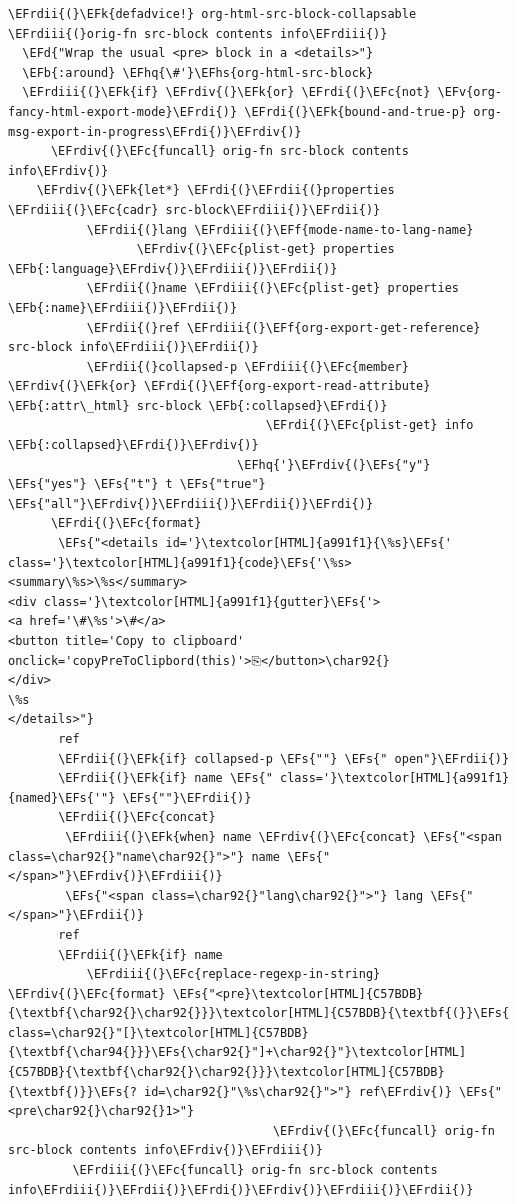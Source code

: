 \documentclass{scrartcl}
\newcommand{\EFk}[1]{\textcolor{EFk}{#1}} %
\newcommand{\EFd}[1]{\textcolor{EFd}{#1}} %
\newcommand{\EFs}[1]{\textcolor{EFs}{#1}} %
\newcommand{\EFb}[1]{\textcolor{EFb}{#1}} %
\newcommand{\EFc}[1]{\textcolor{EFc}{#1}} %
\newcommand{\EFv}[1]{\textcolor{EFv}{#1}} %
\newcommand{\EFf}[1]{\textcolor{EFf}{#1}} %
\newcommand{\EFhq}[1]{#1} %
\newcommand{\EFhs}[1]{#1} %
\newcommand{\EFrdi}[1]{#1} %
\newcommand{\EFrdii}[1]{#1} %
\newcommand{\EFrdiii}[1]{#1} %
\newcommand{\EFrdiv}[1]{#1} %
\begin{document}
\begin{Code}
\begin{Verbatim}[]
\EFrdii{(}\EFk{defadvice!} org-html-src-block-collapsable \EFrdiii{(}orig-fn src-block contents info\EFrdiii{)}
  \EFd{"Wrap the usual <pre> block in a <details>"}
  \EFb{:around} \EFhq{\#'}\EFhs{org-html-src-block}
  \EFrdiii{(}\EFk{if} \EFrdiv{(}\EFk{or} \EFrdi{(}\EFc{not} \EFv{org-fancy-html-export-mode}\EFrdi{)} \EFrdi{(}\EFk{bound-and-true-p} org-msg-export-in-progress\EFrdi{)}\EFrdiv{)}
      \EFrdiv{(}\EFc{funcall} orig-fn src-block contents info\EFrdiv{)}
    \EFrdiv{(}\EFk{let*} \EFrdi{(}\EFrdii{(}properties \EFrdiii{(}\EFc{cadr} src-block\EFrdiii{)}\EFrdii{)}
           \EFrdii{(}lang \EFrdiii{(}\EFf{mode-name-to-lang-name}
                  \EFrdiv{(}\EFc{plist-get} properties \EFb{:language}\EFrdiv{)}\EFrdiii{)}\EFrdii{)}
           \EFrdii{(}name \EFrdiii{(}\EFc{plist-get} properties \EFb{:name}\EFrdiii{)}\EFrdii{)}
           \EFrdii{(}ref \EFrdiii{(}\EFf{org-export-get-reference} src-block info\EFrdiii{)}\EFrdii{)}
           \EFrdii{(}collapsed-p \EFrdiii{(}\EFc{member} \EFrdiv{(}\EFk{or} \EFrdi{(}\EFf{org-export-read-attribute} \EFb{:attr\_html} src-block \EFb{:collapsed}\EFrdi{)}
                                    \EFrdi{(}\EFc{plist-get} info \EFb{:collapsed}\EFrdi{)}\EFrdiv{)}
                                \EFhq{'}\EFrdiv{(}\EFs{"y"} \EFs{"yes"} \EFs{"t"} t \EFs{"true"} \EFs{"all"}\EFrdiv{)}\EFrdiii{)}\EFrdii{)}\EFrdi{)}
      \EFrdi{(}\EFc{format}
       \EFs{"<details id='}\textcolor[HTML]{a991f1}{\%s}\EFs{' class='}\textcolor[HTML]{a991f1}{code}\EFs{'\%s><summary\%s>\%s</summary>
<div class='}\textcolor[HTML]{a991f1}{gutter}\EFs{'>
<a href='\#\%s'>\#</a>
<button title='Copy to clipboard' onclick='copyPreToClipbord(this)'>⎘</button>\char92{}
</div>
\%s
</details>"}
       ref
       \EFrdii{(}\EFk{if} collapsed-p \EFs{""} \EFs{" open"}\EFrdii{)}
       \EFrdii{(}\EFk{if} name \EFs{" class='}\textcolor[HTML]{a991f1}{named}\EFs{'"} \EFs{""}\EFrdii{)}
       \EFrdii{(}\EFc{concat}
        \EFrdiii{(}\EFk{when} name \EFrdiv{(}\EFc{concat} \EFs{"<span class=\char92{}"name\char92{}">"} name \EFs{"</span>"}\EFrdiv{)}\EFrdiii{)}
        \EFs{"<span class=\char92{}"lang\char92{}">"} lang \EFs{"</span>"}\EFrdii{)}
       ref
       \EFrdii{(}\EFk{if} name
           \EFrdiii{(}\EFc{replace-regexp-in-string} \EFrdiv{(}\EFc{format} \EFs{"<pre}\textcolor[HTML]{C57BDB}{\textbf{\char92{}\char92{}}}\textcolor[HTML]{C57BDB}{\textbf{(}}\EFs{ class=\char92{}"[}\textcolor[HTML]{C57BDB}{\textbf{\char94{}}}\EFs{\char92{}"]+\char92{}"}\textcolor[HTML]{C57BDB}{\textbf{\char92{}\char92{}}}\textcolor[HTML]{C57BDB}{\textbf{)}}\EFs{? id=\char92{}"\%s\char92{}">"} ref\EFrdiv{)} \EFs{"<pre\char92{}\char92{}1>"}
                                     \EFrdiv{(}\EFc{funcall} orig-fn src-block contents info\EFrdiv{)}\EFrdiii{)}
         \EFrdiii{(}\EFc{funcall} orig-fn src-block contents info\EFrdiii{)}\EFrdii{)}\EFrdi{)}\EFrdiv{)}\EFrdiii{)}\EFrdii{)}


\end{Verbatim}
\end{Code}
\end{document}
